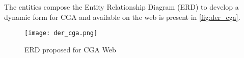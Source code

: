 The entities compose the Entity Relationship Diagram (ERD) to develop a dynamic form for CGA and available on the web is present in \autoref{fig:der_cga}.

\begin{figure}[htb]
\caption{ERD proposed for CGA Web}
 \label{fig:der_cga}
 \centering
 \texttt{[image: der\_cga.png]}
 \fautor
\end{figure}
